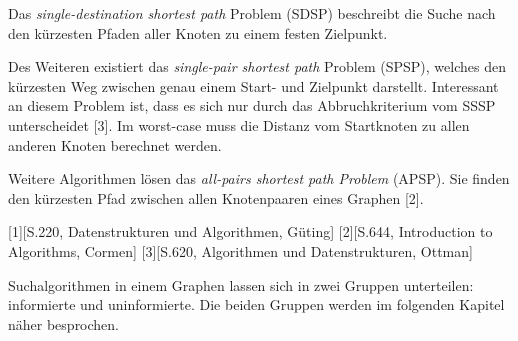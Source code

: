 Das \textit{single-destination shortest path} Problem (SDSP)  beschreibt die Suche nach den kürzesten Pfaden aller Knoten zu einem festen Zielpunkt. 

Des Weiteren existiert das \textit{single-pair shortest path} Problem (SPSP), welches den kürzesten Weg zwischen genau einem Start- und Zielpunkt darstellt. Interessant an diesem Problem ist, dass es sich nur durch das Abbruchkriterium vom SSSP unterscheidet [3]. Im worst-case muss die Distanz vom Startknoten zu allen anderen Knoten berechnet werden. 

Weitere Algorithmen lösen das \textit{all-pairs shortest path Problem} (APSP). Sie finden den kürzesten Pfad zwischen allen Knotenpaaren eines Graphen [2].


[1][S.220, Datenstrukturen und Algorithmen, Güting]
[2][S.644, Introduction to Algorithms, Cormen]
[3][S.620, Algorithmen und Datenstrukturen, Ottman]

Suchalgorithmen in einem Graphen lassen sich in zwei Gruppen unterteilen: informierte und uninformierte. Die beiden Gruppen werden im folgenden Kapitel näher besprochen.